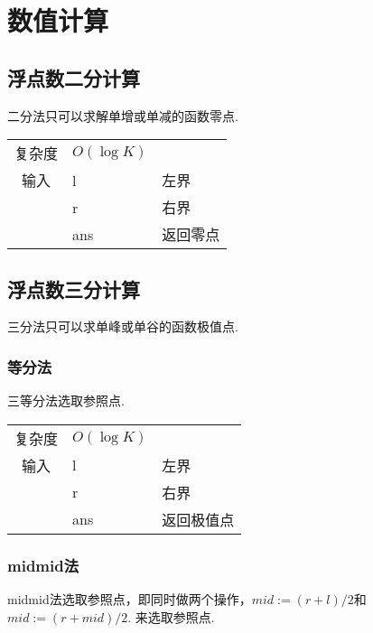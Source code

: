 \section{数值计算}


    \subsection{浮点数二分计算}\small
二分法只可以求解单增或单减的函数零点.

\begin{longtable}{|c|l|l|}
复杂度 & $O(\log K)$ &  \\
输入 & l & 左界 \\
 & r & 右界 \\
 & ans & 返回零点 \\ 
\end{longtable}



    \subsection{浮点数三分计算}\small
三分法只可以求单峰或单谷的函数极值点.



        \subsubsection{等分法}\small
三等分法选取参照点.

\begin{longtable}{|c|l|l|}
复杂度 & $O(\log K)$ &  \\
输入 & l & 左界 \\
 & r & 右界 \\
 & ans & 返回极值点 \\ 
\end{longtable}



        \subsubsection{midmid法}\small
midmid法选取参照点，即同时做两个操作，$mid := (r + l) / 2$和$mid := (r + mid) / 2$.
来选取参照点.

